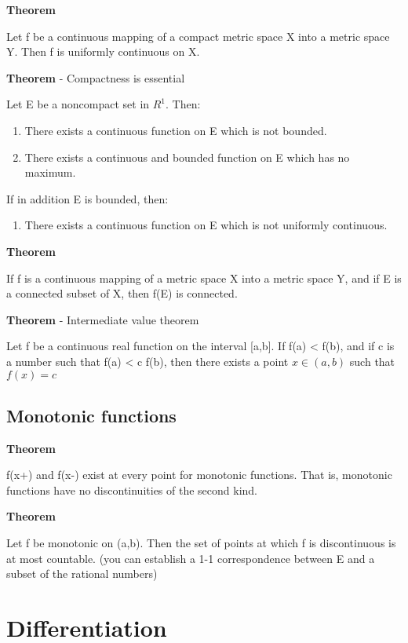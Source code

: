 \documentclass[11pt]{article}
\begin{document}
\textbf{Theorem}

Let f be a continuous mapping of a compact metric space X into a metric space Y. Then f is uniformly continuous on X.

\textbf{Theorem} - Compactness is essential

Let E be a noncompact set in \(R^1\). Then:

\begin{enumerate}
\item There exists a continuous function on E which is not bounded.
\item There exists a continuous and bounded function on E which has no maximum.
\end{enumerate}

If in addition E is bounded, then:

\begin{enumerate}
\item There exists a continuous function on E which is not uniformly continuous.
\end{enumerate}


\textbf{Theorem}

If f is a continuous mapping of a metric space X into a metric space Y, and if E is a connected subset of X, then f(E) is connected.

\textbf{Theorem} - Intermediate value theorem

Let f be a continuous real function on the interval [a,b]. If f(a) < f(b), and if c is a number such that f(a) < c f(b), then there exists a point \(x \in (a,b)\) such that \(f(x) = c\)


\subsection{Monotonic functions}
\label{sec:org9b9cd74}

\textbf{Theorem}

f(x+) and f(x-) exist at every point for monotonic functions. That is, monotonic functions have no discontinuities of the second kind.

\textbf{Theorem}

Let f be monotonic on (a,b). Then the set of points at which f is discontinuous is at most countable. (you can establish a 1-1 correspondence between E and a subset of the rational numbers)

\section{Differentiation}
\label{sec:org6611b09}
\end{document}
